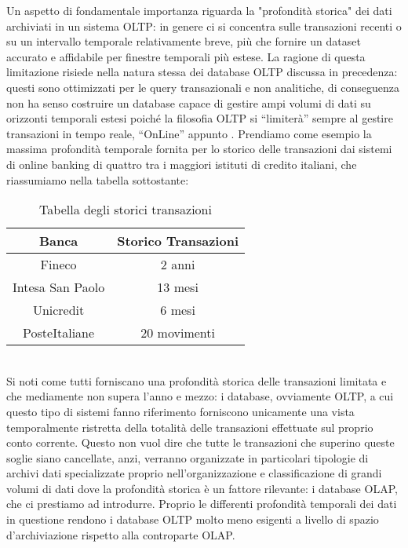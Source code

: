 \documentclass[a4paper,12pt]{report}
\begin{document}
Un aspetto di fondamentale importanza riguarda la "profondità storica" dei dati archiviati in un sistema OLTP: in genere ci si concentra sulle transazioni recenti o su un intervallo temporale relativamente breve, più che fornire un dataset accurato e affidabile per finestre temporali più estese. La ragione di questa limitazione risiede nella natura stessa dei database OLTP discussa in precedenza: questi sono ottimizzati per le query transazionali e non analitiche, di conseguenza non ha senso costruire un database capace di gestire ampi volumi di dati su orizzonti temporali estesi poiché la filosofia OLTP si “limiterà” sempre al gestire transazioni in tempo reale, “OnLine” appunto . Prendiamo come esempio la massima profondità temporale fornita per lo storico delle transazioni dai sistemi di online banking di quattro tra i maggiori istituti di credito italiani, che riassumiamo nella tabella sottostante: 
\begin{table}[ht]
    \centering
    \begin{tabular}{|c|c|}
        \hline
        \textbf{Banca} & \textbf{Storico Transazioni} \\
        \hline
        Fineco & 2 anni \\
        \hline
        Intesa San Paolo & 13 mesi \\
        \hline
        Unicredit & 6 mesi \\
        \hline
        PosteItaliane & 20 movimenti \\
        \hline
    \end{tabular}
    \caption{Tabella degli storici transazioni}
    \label{tab:transazioni}
\end{table}
\noindent
\\[0ex]
Si noti come tutti forniscano una profondità storica delle transazioni limitata e che mediamente non supera l’anno e mezzo: i database, ovviamente OLTP, a cui questo tipo di sistemi fanno riferimento forniscono unicamente una vista temporalmente ristretta della totalità delle transazioni effettuate sul proprio conto corrente. Questo non vuol dire che tutte le transazioni che superino queste soglie siano cancellate, anzi, verranno organizzate in particolari tipologie di archivi dati specializzate proprio nell’organizzazione e classificazione di grandi volumi di dati dove la profondità storica è un fattore rilevante: i database OLAP, che ci prestiamo ad introdurre. Proprio le differenti profondità temporali dei dati in questione rendono i database OLTP molto meno esigenti a livello di spazio d’archiviazione rispetto alla controparte OLAP.
\end{document}
